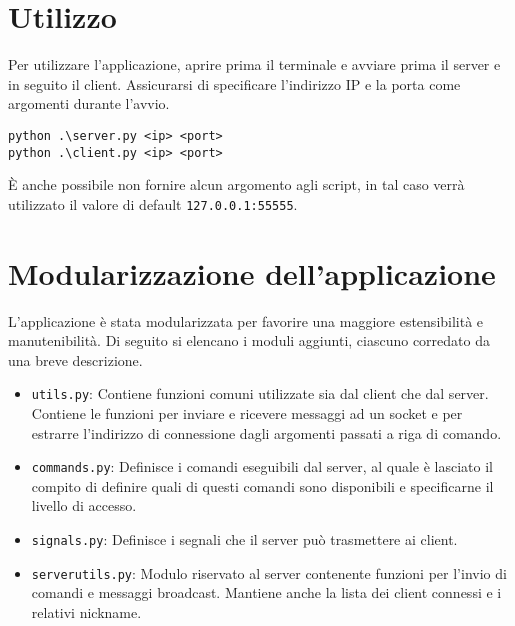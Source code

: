 \documentclass[a4paper,12pt]{report}
\begin{document}
\section{Utilizzo}
Per utilizzare l'applicazione, aprire prima il terminale e avviare prima il server e in seguito il client. Assicurarsi di specificare l'indirizzo IP e la porta come argomenti durante l'avvio.

\begin{lstlisting}
python .\server.py <ip> <port>
python .\client.py <ip> <port>
\end{lstlisting}

È anche possibile non fornire alcun argomento agli script, in tal caso verrà utilizzato il valore di default \verb|127.0.0.1:55555|.

\section{Modularizzazione dell'applicazione}

L'applicazione è stata modularizzata per favorire una maggiore estensibilità e manutenibilità. Di seguito si elencano i moduli aggiunti, ciascuno corredato da una breve descrizione.

\begin{itemize}
    
    \item \verb|utils.py|: Contiene funzioni comuni utilizzate sia dal client che dal server. Contiene le funzioni per inviare e ricevere messaggi ad un socket e per estrarre l'indirizzo di connessione dagli argomenti passati a riga di comando.

    \item \verb|commands.py|: Definisce i comandi eseguibili dal server, al quale è lasciato il compito di definire quali di questi comandi sono disponibili e specificarne il livello di accesso.
    
    \item \verb|signals.py|: Definisce i segnali che il server può trasmettere ai client.

    \item \verb|serverutils.py|: Modulo riservato al server contenente funzioni per l'invio di comandi e messaggi broadcast. Mantiene anche la lista dei client connessi e i relativi nickname.
    
\end{itemize}
\end{document}
